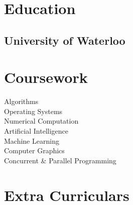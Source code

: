 \documentclass[letterpaper]{kevin-resume} %
\begin{document}
{\begin{minipage}[t]{0.30\textwidth}
\section{Education} 

\subsection{University of Waterloo}


\sectionspace %


\section{Coursework}

Algorithms \\
Operating Systems \\
Numerical Computation \\
Artificial Intelligence \\
Machine Learning \\
Computer Graphics \\
Concurrent \& Parallel Programming

\sectionspace %



\section{Extra Curriculars}

\end{minipage}}
\end{document}
